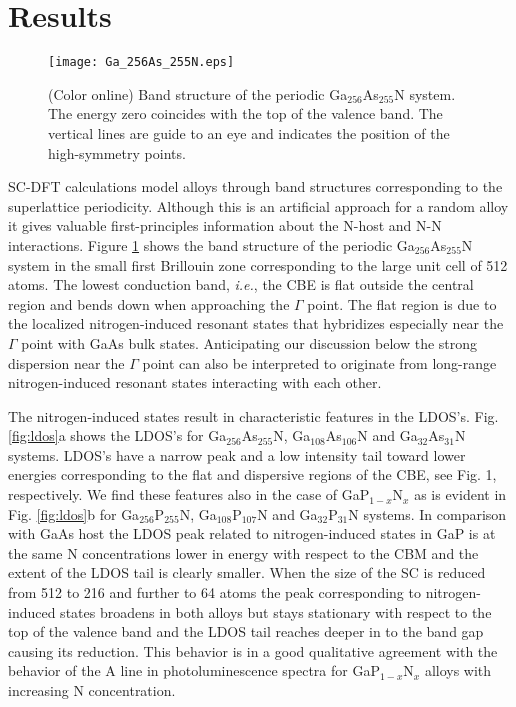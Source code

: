 \documentclass[aps,prb,10pt,twocolumn,groupedaddress]{revtex4-1}
\begin{document}
\section{Results}
\label{sec:results}
\begin{figure}[!t]
  \centering
  \texttt{[image: Ga\_256As\_255N.eps]}
  \caption{(Color online) Band structure of the periodic Ga$_{256}$As$_{255}$N 
system. The energy zero coincides with the top of the valence band. The
vertical lines are guide to an eye and indicates the position of the 
high-symmetry points.}
  \label{fig:band_structure}
\end{figure} 

SC-DFT calculations model alloys through band structures corresponding to 
the superlattice periodicity. Although this is an artificial approach for a
random alloy it gives valuable first-principles information about
the N-host  and N-N interactions. Figure \ref{fig:band_structure} shows
the band structure of the periodic Ga$_{256}$As$_{255}$N system
in the small first Brillouin zone corresponding to the large unit cell of 512
atoms. The lowest conduction band, {\it i.e.}, the CBE is 
flat outside the central region and bends down when approaching the
$\Gamma$ point. The flat region is due to the localized nitrogen-induced 
resonant states that hybridizes especially near the $\Gamma$ point with GaAs 
bulk states. Anticipating our discussion below the strong dispersion near the 
$\Gamma$ point can also be interpreted to originate from long-range 
nitrogen-induced resonant states interacting with each other.


The nitrogen-induced states result in characteristic features in the
LDOS's. Fig. \ref{fig:ldos}a shows the LDOS's
for Ga$_{256}$As$_{255}$N, Ga$_{108}$As$_{106}$N and Ga$_{32}$As$_{31}$N systems. 
LDOS's have a narrow peak and a low intensity tail
toward lower energies corresponding to the flat and dispersive regions
of the CBE, see Fig. 1, respectively. We find these features also in the case 
of GaP$_{1-x}$N$_x$ as is evident in Fig. \ref{fig:ldos}b for 
Ga$_{256}$P$_{255}$N, Ga$_{108}$P$_{107}$N and Ga$_{32}$P$_{31}$N systems. 
In comparison with GaAs host the LDOS peak related to nitrogen-induced states 
in GaP is at the same N concentrations lower in energy with respect to the 
CBM and the extent of the LDOS tail
is clearly smaller.  When the size of the SC is reduced from 512
to 216 and further to 64 atoms the peak corresponding to nitrogen-induced 
states broadens in both alloys but stays stationary 
with respect to the top of the valence band and the LDOS tail reaches deeper 
in to the band gap causing its reduction. This behavior is in a good qualitative
agreement with the behavior of the A line in photoluminescence spectra for 
GaP$_{1-x}$N$_x$ alloys with increasing N concentration.\cite{yaguchi}
\end{document}
